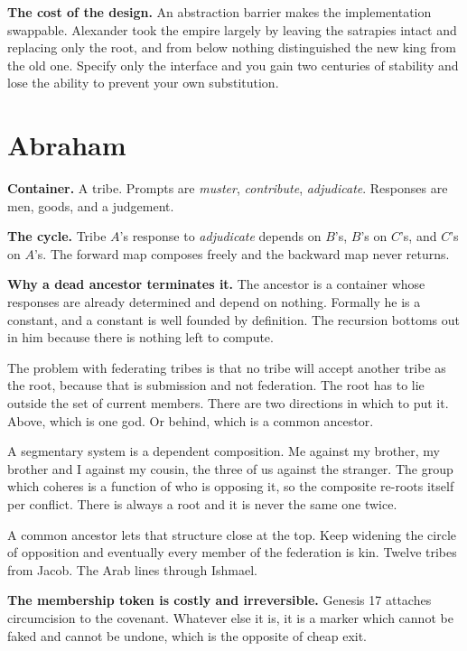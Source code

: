 \documentclass[11pt,a4paper]{article}
\begin{document}
\textbf{The cost of the design.} An abstraction barrier makes the implementation
swappable. Alexander took the empire largely by leaving the satrapies intact and
replacing only the root, and from below nothing distinguished the new king from the
old one. Specify only the interface and you gain two centuries of stability and
lose the ability to prevent your own substitution.

\section{Abraham}

\begin{sectionbox}
\textbf{Container.} A tribe. Prompts are \emph{muster}, \emph{contribute},
\emph{adjudicate}. Responses are men, goods, and a judgement.

\textbf{The cycle.} Tribe $A$'s response to \emph{adjudicate} depends on $B$'s,
$B$'s on $C$'s, and $C$'s on $A$'s. The forward map composes freely and the
backward map never returns.

\textbf{Why a dead ancestor terminates it.} The ancestor is a container whose
responses are already determined and depend on nothing. Formally he is a constant,
and a constant is well founded by definition. The recursion bottoms out in him
because there is nothing left to compute.
\end{sectionbox}

The problem with federating tribes is that no tribe will accept another tribe as
the root, because that is submission and not federation. The root has to lie
outside the set of current members. There are two directions in which to put it.
Above, which is one god. Or behind, which is a common ancestor.

A segmentary system is a dependent composition. Me against my brother, my brother
and I against my cousin, the three of us against the stranger. The group which
coheres is a function of who is opposing it, so the composite re-roots itself per
conflict. There is always a root and it is never the same one twice.

A common ancestor lets that structure close at the top. Keep widening the circle of
opposition and eventually every member of the federation is kin. Twelve tribes from
Jacob. The Arab lines through Ishmael.

\textbf{The membership token is costly and irreversible.} Genesis 17 attaches
circumcision to the covenant. Whatever else it is, it is a marker which cannot be
faked and cannot be undone, which is the opposite of cheap exit.
\end{document}
